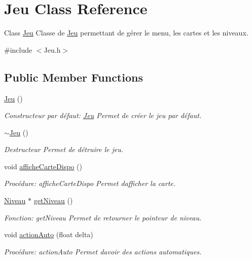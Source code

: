 \hypertarget{classJeu}{}\section{Jeu Class Reference}
\label{classJeu}


Class \hyperlink{classJeu}{Jeu} Classe de \hyperlink{classJeu}{Jeu} permettant de gérer le menu, les cartes et les niveaux.  




{\ttfamily \#include $<$Jeu.\+h$>$}

\subsection*{Public Member Functions}
\begin{DoxyCompactItemize}
\item 
\hyperlink{classJeu_acc5795ee00edf75516d3dfe65be3e6d6}{Jeu} ()
\begin{DoxyCompactList}\small\item\em Constructeur par défaut\+: \hyperlink{classJeu}{Jeu} Permet de créer le jeu par défaut. \end{DoxyCompactList}\item 
\mbox{\label{classJeu_a9cd19e73df169d7f09397be61ba8548c}} 
\hyperlink{classJeu_a9cd19e73df169d7f09397be61ba8548c}{$\sim$\+Jeu} ()
\begin{DoxyCompactList}\small\item\em Destructeur Permet de détruire le jeu. \end{DoxyCompactList}\item 
void \hyperlink{classJeu_a4f8c73b225819fb5a6ba342adc2f1fa4}{affiche\+Carte\+Dispo} ()
\begin{DoxyCompactList}\small\item\em Procédure\+: affiche\+Carte\+Dispo Permet d\textquotesingle{}afficher la carte. \end{DoxyCompactList}\item 
\hyperlink{classNiveau}{Niveau} $\ast$ \hyperlink{classJeu_a71bf0b5329ade330d95318b50d1e2f12}{get\+Niveau} ()
\begin{DoxyCompactList}\small\item\em Fonction\+: get\+Niveau Permet de retourner le pointeur de niveau. \end{DoxyCompactList}\item 
void \hyperlink{classJeu_a8d2a0773d8edcb42d5e055785ad4b71a}{action\+Auto} (float delta)
\begin{DoxyCompactList}\small\item\em Procédure\+: action\+Auto Permet d\textquotesingle{}avoir des actions automatiques. \end{DoxyCompactList}\end{DoxyCompactItemize}



